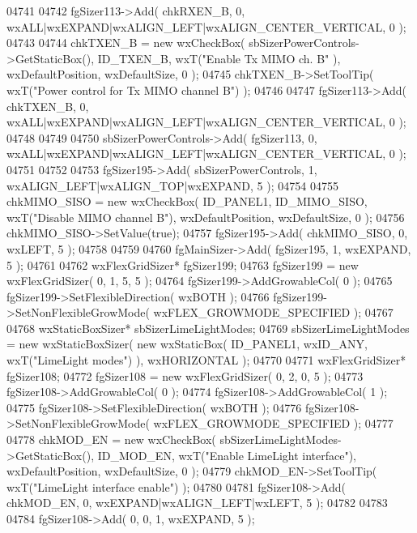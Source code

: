 \begin{DoxyCode}
04741     
04742     fgSizer113->Add( chkRXEN_B, 0, wxALL|wxEXPAND|wxALIGN\_LEFT|wxALIGN\_CENTER\_VERTICAL, 0 );
04743     
04744     chkTXEN_B = \textcolor{keyword}{new} wxCheckBox( sbSizerPowerControls->GetStaticBox(), ID_TXEN_B, wxT(\textcolor{stringliteral}{"Enable Tx MIMO ch. B"}
      ), wxDefaultPosition, wxDefaultSize, 0 );
04745     chkTXEN_B->SetToolTip( wxT(\textcolor{stringliteral}{"Power control for Tx MIMO channel B"}) );
04746     
04747     fgSizer113->Add( chkTXEN_B, 0, wxALL|wxEXPAND|wxALIGN\_LEFT|wxALIGN\_CENTER\_VERTICAL, 0 );
04748     
04749     
04750     sbSizerPowerControls->Add( fgSizer113, 0, wxALL|wxEXPAND|wxALIGN\_LEFT|wxALIGN\_CENTER\_VERTICAL, 0 );
04751     
04752     
04753     fgSizer195->Add( sbSizerPowerControls, 1, wxALIGN\_LEFT|wxALIGN\_TOP|wxEXPAND, 5 );
04754     
04755     chkMIMO_SISO = \textcolor{keyword}{new} wxCheckBox( ID_PANEL1, ID_MIMO_SISO, wxT(\textcolor{stringliteral}{"Disable MIMO channel B"}), 
      wxDefaultPosition, wxDefaultSize, 0 );
04756     chkMIMO_SISO->SetValue(\textcolor{keyword}{true}); 
04757     fgSizer195->Add( chkMIMO_SISO, 0, wxLEFT, 5 );
04758     
04759     
04760     fgMainSizer->Add( fgSizer195, 1, wxEXPAND, 5 );
04761     
04762     wxFlexGridSizer* fgSizer199;
04763     fgSizer199 = \textcolor{keyword}{new} wxFlexGridSizer( 0, 1, 5, 5 );
04764     fgSizer199->AddGrowableCol( 0 );
04765     fgSizer199->SetFlexibleDirection( wxBOTH );
04766     fgSizer199->SetNonFlexibleGrowMode( wxFLEX\_GROWMODE\_SPECIFIED );
04767     
04768     wxStaticBoxSizer* sbSizerLimeLightModes;
04769     sbSizerLimeLightModes = \textcolor{keyword}{new} wxStaticBoxSizer( \textcolor{keyword}{new} wxStaticBox( ID_PANEL1, wxID\_ANY, wxT(\textcolor{stringliteral}{"LimeLight
       modes"}) ), wxHORIZONTAL );
04770     
04771     wxFlexGridSizer* fgSizer108;
04772     fgSizer108 = \textcolor{keyword}{new} wxFlexGridSizer( 0, 2, 0, 5 );
04773     fgSizer108->AddGrowableCol( 0 );
04774     fgSizer108->AddGrowableCol( 1 );
04775     fgSizer108->SetFlexibleDirection( wxBOTH );
04776     fgSizer108->SetNonFlexibleGrowMode( wxFLEX\_GROWMODE\_SPECIFIED );
04777     
04778     chkMOD_EN = \textcolor{keyword}{new} wxCheckBox( sbSizerLimeLightModes->GetStaticBox(), ID_MOD_EN, wxT(\textcolor{stringliteral}{"Enable LimeLight
       interface"}), wxDefaultPosition, wxDefaultSize, 0 );
04779     chkMOD_EN->SetToolTip( wxT(\textcolor{stringliteral}{"LimeLight interface enable"}) );
04780     
04781     fgSizer108->Add( chkMOD_EN, 0, wxEXPAND|wxALIGN\_LEFT|wxLEFT, 5 );
04782     
04783     
04784     fgSizer108->Add( 0, 0, 1, wxEXPAND, 5 );

\end{DoxyCode}
